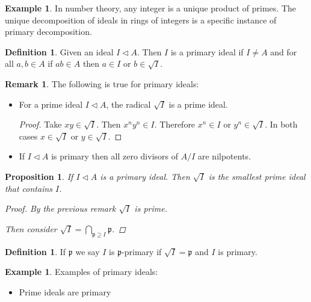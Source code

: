 \documentclass{article}
\newcommand{\primeid}{\mathfrak{p}}
\newcommand{\ideal}{\triangleleft}
\newtheorem{proposition}[theorem]{Proposition}
\theoremstyle{definition}
\newtheorem{definition}[theorem]{Definition}
\newtheorem{remark}[theorem]{Remark}
\newtheorem{example}[theorem]{Example}
\begin{document}
\begin{example}
    In number theory, any integer is a unique product of primes. The unique
    decomposition of ideals in rings of integers is a specific instance of
    primary decomposition.
\end{example}

\begin{definition}
    Given an ideal \(I\ideal A\). Then \(I\) is a primary ideal if
    \(I\neq A\) and for all \(a,b\in A\) if \(ab\in A\) then \(a\in I\)
    or \(b\in\sqrt{I}\).
\end{definition}

\begin{remark}
    The following is true for primary ideals:
    \begin{itemize}
        \item For a prime ideal \(I\ideal A\), the radical \(\sqrt{I}\) is a prime ideal.

              \begin{proof}
                  Take \(xy\in\sqrt{I}\). Then \(x^{n}y^{n}\in I\). Therefore \(x^{n}\in
                  I\) or \(y^{n}\in\sqrt{I}\). In both cases \(x\in\sqrt{I}\) or
                  \(y\in\sqrt{I}\).
              \end{proof}

        \item If \(I\ideal A\) is primary then all zero divisors of \(A/I\) are
              nilpotents.
    \end{itemize}
\end{remark}

\begin{proposition}
    If \(I\ideal A\) is a primary ideal. Then \(\sqrt{I}\) is the smallest prime
    ideal that contains \(I\).

    \begin{proof}
        By the previous remark \(\sqrt{I}\) is prime.

        Then consider \(\sqrt{I}=\bigcap_{\primeid\supseteq I}\primeid\).
    \end{proof}
\end{proposition}

\begin{definition}
    If \(\primeid\) we say \(I\) is \(\primeid\)-primary if
    \(\sqrt{I}=\primeid\) and \(I\) is primary.
\end{definition}

\begin{example}
    Examples of primary ideals:
    \begin{itemize}
        \item Prime ideals are primary
    \end{itemize}
\end{example}
\end{document}
